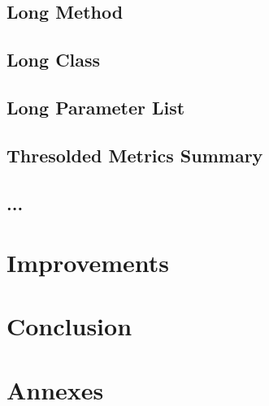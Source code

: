 \documentclass[11pt,a4paper]{article}
\begin{document}
\subsection{Long Method}
\subsection{Long Class}
\subsection{Long Parameter List}
\subsection{Thresolded Metrics Summary}
\subsection{...}
\section{Improvements}
\section{Conclusion}
\section{Annexes}
\end{document}
